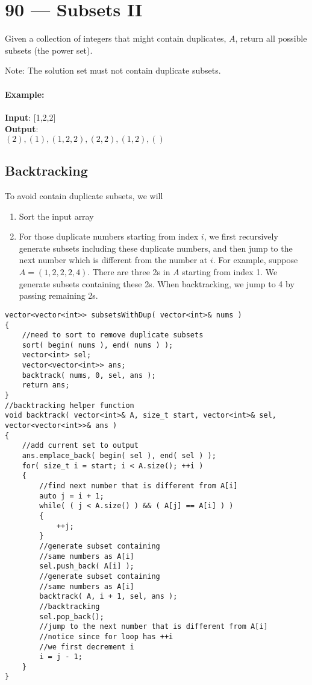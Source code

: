 \section{90 --- Subsets II}
Given a collection of integers that might contain duplicates, $A$, return all possible subsets (the power set).
\par
Note: The solution set must not contain duplicate subsets.
\paragraph{Example:}
\begin{flushleft}
\textbf{Input}: [1,2,2]
\\
\textbf{Output}:
\\
$(2),(1),(1,2,2),(2,2), (1,2), ()$
\end{flushleft}

\subsection{Backtracking}
To avoid contain duplicate subsets, we will 
\begin{enumerate}
\item Sort the input array
\item For those duplicate numbers starting from index $i$, we first recursively generate subsets including these duplicate numbers, and then jump to the next number which is different from the number at $i$. For example, suppose $A=(1,2,2,2,4)$. There are three 2s in $A$ starting from index 1. We generate subsets containing these 2s. When backtracking, we jump to 4 by passing remaining 2s.
\end{enumerate}

\setcounter{lstlisting}{0}
\begin{lstlisting}[style=customc, caption={Backtracking}]
vector<vector<int>> subsetsWithDup( vector<int>& nums )
{
    //need to sort to remove duplicate subsets
    sort( begin( nums ), end( nums ) );
    vector<int> sel;
    vector<vector<int>> ans;
    backtrack( nums, 0, sel, ans );
    return ans;
}
//backtracking helper function
void backtrack( vector<int>& A, size_t start, vector<int>& sel, vector<vector<int>>& ans )
{
    //add current set to output
    ans.emplace_back( begin( sel ), end( sel ) );
    for( size_t i = start; i < A.size(); ++i )
    {
        //find next number that is different from A[i]
        auto j = i + 1;
        while( ( j < A.size() ) && ( A[j] == A[i] ) )
        {
            ++j;
        }
        //generate subset containing
        //same numbers as A[i]
        sel.push_back( A[i] );
        //generate subset containing
        //same numbers as A[i]
        backtrack( A, i + 1, sel, ans );
        //backtracking
        sel.pop_back();
        //jump to the next number that is different from A[i]
        //notice since for loop has ++i
        //we first decrement i
        i = j - 1;
    }
}
\end{lstlisting}